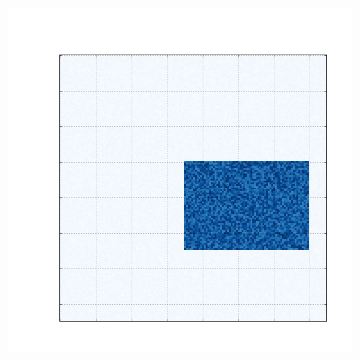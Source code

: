 \documentclass[
    12pt,                %
    oneside,            %
    a4paper,            %
    english,            %
    brazil                %
    ]{abntex2ppgsi}
\begin{document}
\begin{figure} [htpb]
\centering
 \caption{
        Dados sintéticos gerados a partir das diferentes estruturas de cogrupos.
        (a) Um único cogrupo.
        (b) Cogrupos com linhas e colunas sem intersecção.
        (c) Cogrupos com estrutura em xadrez.  %
        (d) Cogrupos sem intersecção nas linhas e com intersecção nas colunas.
        (e) Cogrupos com intersecção nas linhas e sem intersecção nas colunas.
    }
    \begin{subfigure}[b]{0.18\textwidth}
        \includegraphics[width=\textwidth]{img/a-bic-structure.png}
        \caption{}
        \label{fig:bic-syntetic-structure:a}
    \end{subfigure}
    ~
    \begin{subfigure}[b]{0.18\textwidth}

\end{subfigure}
\end{figure}
\end{document}
